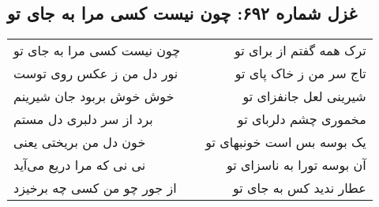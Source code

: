 \begin{center}
\section*{غزل شماره ۶۹۲: چون نیست کسی مرا به جای تو}
\label{sec:692}
\begin{longtable}{l p{0.5cm} r}
چون نیست کسی مرا به جای تو
&&
ترک همه گفتم از برای تو
\\
نور دل من ز عکس روی توست
&&
تاج سر من ز خاک پای تو
\\
خوش خوش بربود جان شیرینم
&&
شیرینی لعل جانفزای تو
\\
برد از سر دلبری دل مستم
&&
مخموری چشم دلربای تو
\\
خون دل من بریختی یعنی
&&
یک بوسه بس است خونبهای تو
\\
نی نی که مرا دریع می‌آید
&&
آن بوسه تورا به ناسزای تو
\\
از جور چو من کسی چه برخیزد
&&
عطار ندید کس به جای تو
\\
\end{longtable}
\end{center}
